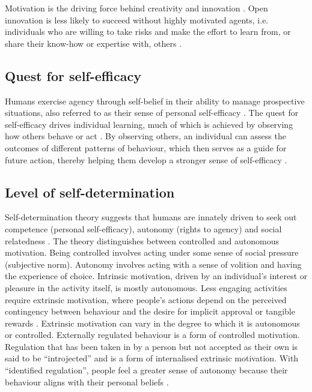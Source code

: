 Motivation is the  driving force behind creativity and innovation  \citep{amabile1988model,hennessey2010creativity}. Open innovation is less likely to succeed without highly motivated agents, i.e. individuals who are willing to take risks and make the effort to learn from, or share their know-how or expertise with, others \citep{nonaka1994dynamic,leonard1998role,bock2005behavioral}. 

\subsection{Quest for self-efficacy}

Humans exercise agency through self-belief in their ability to manage prospective situations, also referred to as their sense of personal self-efficacy \citep{white1959motivation, bandura1994self}. The quest for self-efficacy drives individual learning, much of which is achieved by observing how others behave or act \citep{bandura1986social}. By observing others, an individual can assess the outcomes of different patterns of behaviour, which then serves as a guide for future action, thereby helping them develop a stronger sense of self-efficacy \citep{bandura1977self,bandura1999social}. 

\subsection{Level of self-determination}

Self-determination theory suggests that humans are innately driven to seek out competence (personal self-efficacy), autonomy (rights to agency) and social relatedness \citep{ryan2000self}. The theory distinguishes between controlled and autonomous motivation. Being controlled involves acting under some sense of social pressure (subjective norm). Autonomy involves acting with a sense of volition and having the experience of choice. Intrinsic motivation, driven by an individual's interest or pleasure in the activity itself, is mostly autonomous. Less engaging activities require extrinsic motivation, where people's actions depend on the perceived contingency between behaviour and the desire for implicit approval or tangible rewards \citep{gagne2005self}. Extrinsic motivation can vary in the degree to which it is autonomous or controlled. Externally regulated behaviour is a form of controlled motivation. Regulation that has been taken in by a person but not accepted as their own is said to be \enquote{introjected} and is a form of internalised extrinsic motivation. With \enquote{identified regulation}, people feel a greater sense of autonomy because their behaviour aligns with their personal beliefs \citep{gagne2005self}. \medskip

